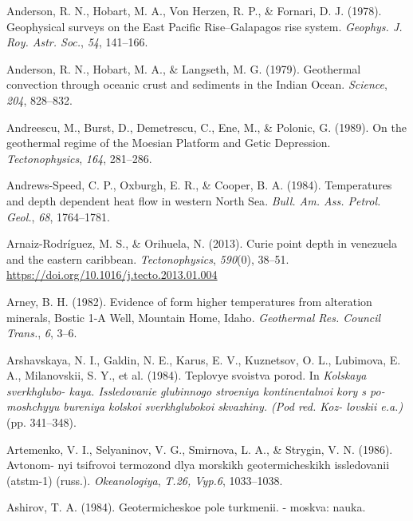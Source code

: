 \begin{CSLReferences}{1}{1}
\leavevmode{}%
Anderson, R. N., Hobart, M. A., Von Herzen, R. P., \& Fornari, D. J. (1978). Geophysical surveys on the {East Pacific Rise--Galapagos} rise system. \emph{Geophys. J. Roy. Astr. Soc.}, \emph{54}, 141--166.

\leavevmode{}%
Anderson, R. N., Hobart, M. A., \& Langseth, M. G. (1979). Geothermal convection through oceanic crust and sediments in the {Indian Ocean}. \emph{Science}, \emph{204}, 828--832.

\leavevmode{}%
Andreescu, M., Burst, D., Demetrescu, C., Ene, M., \& Polonic, G. (1989). On the geothermal regime of the {Moesian Platform and Getic Depression}. \emph{Tectonophysics}, \emph{164}, 281--286.

\leavevmode{}%
Andrews-Speed, C. P., Oxburgh, E. R., \& Cooper, B. A. (1984). Temperatures and depth dependent heat flow in western {North Sea}. \emph{Bull. Am. Ass. Petrol. Geol.}, \emph{68}, 1764--1781.

\leavevmode{}%
Arnaiz-Rodríguez, M. S., \& Orihuela, N. (2013). Curie point depth in venezuela and the eastern caribbean. \emph{Tectonophysics}, \emph{590}(0), 38--51. \url{https://doi.org/10.1016/j.tecto.2013.01.004}

\leavevmode{}%
Arney, B. H. (1982). Evidence of form higher temperatures from alteration minerals, {Bostic 1-A Well, Mountain Home, Idaho}. \emph{Geothermal Res. Council Trans.}, \emph{6}, 3--6.

\leavevmode{}%
Arshavskaya, N. I., Galdin, N. E., Karus, E. V., Kuznetsov, O. L., Lubimova, E. A., Milanovskii, S. Y., et al. (1984). Teplovye svoistva porod. In \emph{Kolskaya sverkhglubo- kaya. Issledovanie glubinnogo stroeniya kontinentalnoi kory s po- moshchyyu bureniya kolskoi sverkhglubokoi skvazhiny. (Pod red. Koz- lovskii e.a.)} (pp. 341--348).

\leavevmode{}%
Artemenko, V. I., Selyaninov, V. G., Smirnova, L. A., \& Strygin, V. N. (1986). Avtonom- nyi tsifrovoi termozond dlya morskikh geotermicheskikh issledovanii (atstm-1) (russ.). \emph{Okeanologiya}, \emph{T.26, Vyp.6}, 1033--1038.

\leavevmode{}%
Ashirov, T. A. (1984). Geotermicheskoe pole turkmenii. - moskva: nauka.


\end{CSLReferences}
